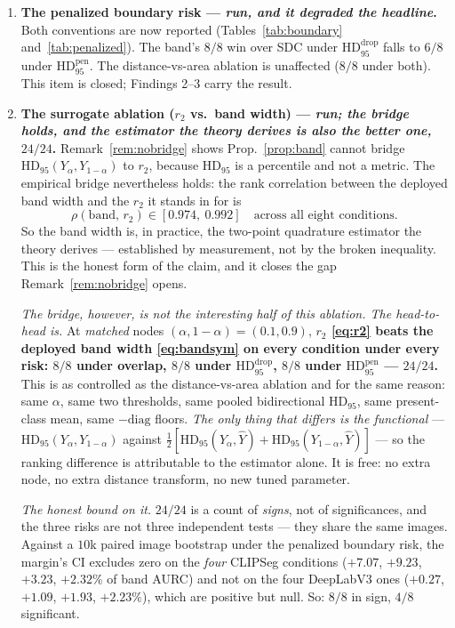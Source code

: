 \documentclass[11pt]{article}
\theoremstyle{remark}
\newcommand{\Yhat}{\widehat{Y}}
\newcommand{\Ylo}{Y_{\alpha}}
\newcommand{\Yhi}{Y_{1-\alpha}}
\newcommand{\HDF}{\mathrm{HD}_{95}}
\newcommand{\diag}{\mathrm{diag}}
\begin{document}
\begin{enumerate}
\item \textbf{The penalized boundary risk --- \emph{run, and it degraded the
headline}.} Both conventions are now reported (Tables~\ref{tab:boundary}
and~\ref{tab:penalized}). The band's $8/8$ win over SDC under
$\HDF^{\mathrm{drop}}$ falls to $6/8$ under $\HDF^{\mathrm{pen}}$. The
distance-vs-area ablation is unaffected ($8/8$ under both). This item is closed;
Findings 2--3 carry the result.

\item \textbf{The surrogate ablation ($r_2$ vs.\ band width) --- \emph{run; the bridge
holds, and the estimator the theory derives is also the better one, $24/24$}.}
Remark~\ref{rem:nobridge} shows Prop.~\ref{prop:band} cannot bridge
$\HDF(\Ylo,\Yhi)$ to $r_2$, because $\HDF$ is a percentile and not a metric. The
empirical bridge nevertheless holds: the rank correlation between the deployed band
width and the $r_2$ it stands in for is
\begin{equation}
\rho(\text{band},\, r_2) \in [0.974,\ 0.992] \quad\text{across all eight conditions.}
\end{equation}
So the band width is, in practice, the two-point quadrature estimator the theory
derives --- established by measurement, not by the broken inequality. This is the
honest form of the claim, and it closes the gap Remark~\ref{rem:nobridge} opens.

\emph{The bridge, however, is not the interesting half of this ablation. The head-to-head
is.} At \emph{matched} nodes $(\alpha, 1-\alpha) = (0.1, 0.9)$, \textbf{$r_2$
\eqref{eq:r2} beats the deployed band width \eqref{eq:bandsym} on every condition under
every risk: $8/8$ under overlap, $8/8$ under $\HDF^{\mathrm{drop}}$, $8/8$ under
$\HDF^{\mathrm{pen}}$ --- $24/24$.} This is as controlled as the distance-vs-area
ablation and for the same reason: same $\alpha$, same two thresholds, same pooled
bidirectional $\HDF$, same present-class mean, same $-\diag$ floors. \emph{The only thing
that differs is the functional} --- $\HDF(\Ylo,\Yhi)$ against
$\tfrac12[\HDF(\Ylo,\Yhat) + \HDF(\Yhi,\Yhat)]$ --- so the ranking difference is
attributable to the estimator alone. It is free: no extra node, no extra distance
transform, no new tuned parameter.

\emph{The honest bound on it.} $24/24$ is a count of \emph{signs}, not of significances,
and the three risks are not three independent tests --- they share the same images.
Against a $10$k paired image bootstrap under the penalized boundary risk, the margin's CI
excludes zero on the \emph{four} CLIPSeg conditions ($+7.07$, $+9.23$, $+3.23$,
$+2.32\%$ of band AURC) and not on the four DeepLabV3 ones ($+0.27$, $+1.09$, $+1.93$,
$+2.23\%$), which are positive but null. So: $8/8$ in sign, $4/8$ significant.


\end{enumerate}
\end{document}
